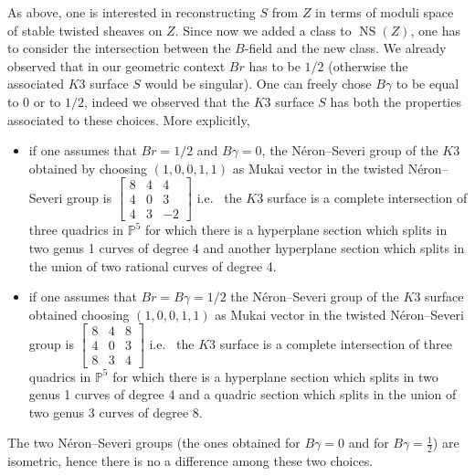 \documentclass{amsart}
\theoremstyle{definition}
\numberwithin{equation}{section}
\numberwithin{equation}{section} \theoremstyle{definition}
\DeclareMathOperator{\NS}{NS}
\begin{document}
As above, one is interested in reconstructing $S$ from $Z$ in terms of moduli space of stable twisted sheaves on $Z$. Since now we added a class to $\NS(Z)$, one has to consider the intersection between the $B$-field and the new class. We already observed that in our geometric context $Br$ has to be $1/2$ (otherwise the associated $K3$ surface $S$ would be singular). One can freely chose $B\gamma$ to be equal to 0 or to $1/2$, indeed we observed that the $K3$ surface $S$ has both the properties associated to these choices. More explicitly, \begin{itemize}\item if one assumes that $Br=1/2$ and $B\gamma=0$, the N\'eron--Severi group of the $K3$ obtained by choosing $(1,0,0,1,1)$ as Mukai vector in the twisted N\'eron--Severi group is $\left[\begin{array}{ccc}8&4&4\\4&0&3\\4&3&-2\end{array}\right]$ %
i.e.~ the $K3$ surface is a complete intersection of three quadrics in $\mathbb{P}^5$ for which there is a hyperplane section which splits in two genus 1 curves of degree 4 and another hyperplane section which splits in the union of two rational curves of degree 4.
\item if one assumes that $Br=B\gamma=1/2$ the N\'eron--Severi group of the $K3$ surface obtained choosing $(1,0,0,1,1)$ as Mukai vector in the twisted N\'eron--Severi group is 
$\left[\begin{array}{ccc}8&4&8\\4&0&3\\8&3&4\end{array}\right]$
i.e.~ the $K3$ surface is a complete intersection of three quadrics in $\mathbb{P}^5$ for which there is a hyperplane section which splits in two genus 1 curves of degree 4 and a quadric section which splits in the union of two genus 3 curves  of degree 8.\end{itemize}
The two N\'eron--Severi groups (the ones obtained for $B\gamma=0$ and for $B\gamma=\frac{1}{2}$) are isometric, hence there is no a difference among these two choices.
\end{document}
